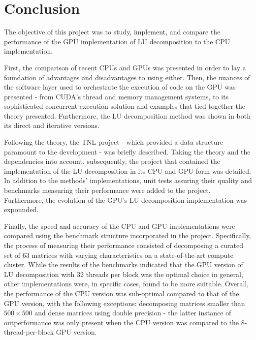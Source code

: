 \chapter*{Conclusion \TO}				   %

The objective of this project was to study, implement, and compare the performance of the GPU implementation of LU decomposition to the CPU implementation.
\par First, the comparison of recent CPUs and GPUs was presented in order to lay a foundation of advantages and disadvantages to using either. Then, the nuances of the software layer used to orchestrate the execution of code on the GPU was presented - from CUDA's thread and memory management systems, to its sophisticated concurrent execution solution and examples that tied together the theory presented. Furthermore, the LU decomposition method was shown in both its direct and iterative versions.
\par Following the theory, the TNL project - which provided a data structure paramount to the development - was briefly described. Taking the theory and the dependencies into account, subsequently, the project that contained the implementation of the LU decomposition in its CPU and GPU form was detailed. In addition to the methods' implementations, unit tests assuring their quality and benchmarks measuring their performance were added to the project. Furthermore, the evolution of the GPU's LU decomposition implementation was expounded.
\par Finally, the speed and accuracy of the CPU and GPU implementations were compared using the benchmark structure incorporated in the project. Specifically, the process of measuring their performance consisted of decomposing a curated set of 63 matrices with varying characteristics on a state-of-the-art compute cluster. While the results of the benchmarks indicated that the GPU version of LU decomposition with 32 threads per block was the optimal choice in general, other implementations were, in specific cases, found to be more suitable. Overall, the performance of the CPU version was sub-optimal compared to that of the GPU version, with the following exceptions: decomposing matrices smaller than $ 500\times 500 $ and dense matrices using double precision - the latter instance of outperformance was only present when the CPU version was compared to the 8-thread-per-block GPU version.
